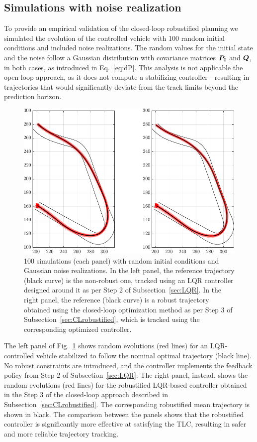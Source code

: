 \subsection{Simulations with noise realization}
To provide an empirical validation of the closed-loop robustified planning we simulated the evolution of the controlled vehicle with 100 random initial conditions and included noise realizations. The random values for the initial state and the noise follow a Gaussian distribution with covariance matrices $\boldsymbol{P}_0$ and $\boldsymbol{Q}$, in both cases, as introduced in Eq.~\eqref{eq:dP}. This analysis is not applicable the open-loop approach, as it does not compute a stabilizing controller---resulting in trajectories that would significantly deviate from the track limits beyond the prediction horizon.
\begin{figure}[t!]
	\centering
	\includegraphics{Fig/olcl_traj_strings.pdf}
	\caption{100 simulations (each panel) with random initial conditions and Gaussian noise realizations. In the left panel, the reference trajectory (black curve) is the non-robust one, tracked using an LQR controller designed around it as per Step 2 of Subsection~\ref{sec:LQR}. In the right panel, the reference (black curve) is a robust trajectory obtained using the closed-loop optimization method as per Step 3 of Subsection~\ref{sec:CLrobustified}, which is tracked using the corresponding optimized controller.}
	\label{fig:traj_strings}
\end{figure}

The left panel of Fig.~\ref{fig:traj_strings} shows random evolutions (red lines) for an LQR-controlled vehicle stabilized to follow the nominal optimal trajectory (black line). No robust constraints are introduced, and the controller implements the feedback policy from Step 2 of Subsection~\ref{sec:LQR}. The right panel, instead, shows the random evolutions (red lines) for the robustified LQR-based controller obtained in the Step 3 of the closed-loop approach described in Subsection~\ref{sec:CLrobustified}. The corresponding robustified mean trajectory is shown in black.
The comparison between the panels shows that the robustified controller is significantly more effective at satisfying the TLC, resulting in safer and more reliable trajectory tracking.


